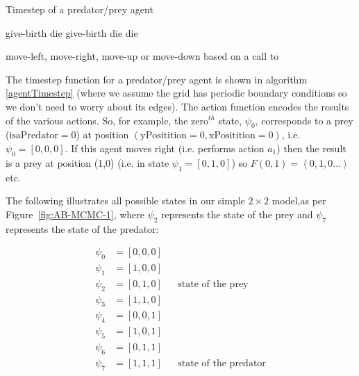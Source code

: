 \documentclass{article}
\begin{document}
\begin{algorithm}
\caption{Timestep of a predator/prey agent}
\label{agentTimestep}
\begin{algorithmic}
    \State\Return give-birth 
  \EndIf
    \State\Return die
  \EndIf
\Else
    \State\Return give-birth
  \EndIf
    \State\Return die
  \EndIf
    \State\Return die 
  \EndIf
  
\EndIf
\State \Return move-left, move-right, move-up or move-down based on a call to 
\EndFunction
\end{algorithmic}
\end{algorithm}

The timestep function for a predator/prey agent is shown in algorithm \ref{agentTimestep} (where we assume the grid has periodic boundary conditions so we don't need to worry about its edges). The action function encodes the results of the various actions. So, for example, the zero$^{th}$ state, $\psi_0$, corresponds to a prey ($\textrm{isaPredator}=0$) at position $(\textrm{yPositition}=0,\textrm{xPositition}=0)$, i.e. $\psi_0=[0,0,0]$. If this agent moves right (i.e. performs action $a_1$) then the result is a prey at position (1,0) (i.e. in state $\psi_1=[0,1,0]$) so $F(0,1) = \left<0,1,0...\right>$ etc.


The following illustrates all possible states in our simple $2\times2$ model,as per Figure~\ref{fig:AB-MCMC-1}, where $\psi_2$ represents the state of the prey and $\psi_7$ represents the state of the predator:

\begin{align*}
\psi_0 &= [0, 0, 0] \\
\psi_1 &= [1, 0, 0 ] \\
\psi_2 &= [0, 1, 0 ] && \text{state of the prey} \\
\psi_3 &= [1,  1, 0] \\
\psi_4 &= [0, 0, 1] \\
\psi_5 &= [1, 0, 1] \\
\psi_6 &= [0, 1, 1] \\
\psi_7 &= [1, 1, 1]  && \text{state of the predator} \\
\end{align*}
\end{document}
